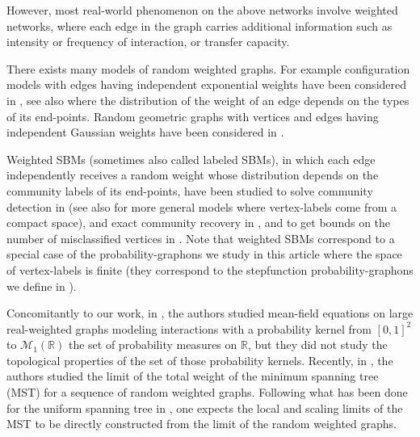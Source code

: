 \documentclass{amsart}
\theoremstyle{plain}
\theoremstyle{definition}
\newcommand{\ProbaX}[1]{\mathcal{M}_1(#1)}
\newcommand{\R}{\mathbb{R}}
\begin{document}
However,  most  real-world  phenomenon  on the  above  networks  involve
weighted  networks, where  each  edge in  the  graph carries  additional
information such as  intensity or frequency of  interaction, or transfer
capacity.  

There exists  many models of random  weighted graphs.  For
example configuration  models with edges having  independent exponential
weights        have        been       considered        in        \cite{
  bhamidiFirstPassagePercolation2010a,  aminiFloodingWeightedSparse2013,
  aminiDiameterWeightedRandom2015},               see               also
\cite{garlaschelliWeightedRandomGraph2009,    hurdWattsCascadeModel2013}
 where the  distribution of the weight of an edge depends on the types
 of its end-points.
Random geometric graphs
 with vertices and edges having independent Gaussian weights have been
 considered in \cite{alonsoWeightedRandomgeometricRandomrectangular2018}. 
 
Weighted SBMs (sometimes also called labeled SBMs), 
in which each edge independently receives  a random weight whose distribution depends on the 
	community labels of its end-points,
have been studied to solve community detection in
\cite{lelargeReconstructionLabeledStochastic2013}
(see also \cite{xuEdgeLabelInference2014} for more general models where vertex-labels come from a compact space),
and exact community recovery in \cite{jogRecoveringCommunitiesWeighted2015},
and to get bounds on the number of misclassified vertices in \cite{yunOptimalClusterRecovery2016,xuOptimalRatesCommunity2020}.
Note that weighted SBMs correspond to a special case of the probability-graphons we study in this article
where the space of vertex-labels is finite (they correspond to the stepfunction probability-graphons we define
	in ).
 \medskip        

	Concomitantly to our work,  in  \cite{ayiGraphLimitInteracting2023}, the  authors
        studied mean-field  equations on  large real-weighted  graphs modeling interactions 
        with      a     probability     kernel from
        $[0,1]^2$ to $\ProbaX{\R}$ the set of
        probability  measures  on  $\R$,  but  they  did  not  study  the
      topological   properties  of the set of  those   probability  kernels.   
      Recently, in \cite{hladkyRandomMinimumSpanning2023}, the authors
        studied the limit of the total weight of the minimum spanning tree (MST)
        for a  sequence of random  weighted graphs.  Following  what has
        been    done    for    the     uniform    spanning    tree    in
        \cite{hladkyLocalLimitUniform2018,   archerGHPScalingLimit2022},
        one  expects the  local  and scaling  limits of  the  MST to  be
        directly constructed from the
        limit of the random weighted graphs.
\end{document}
